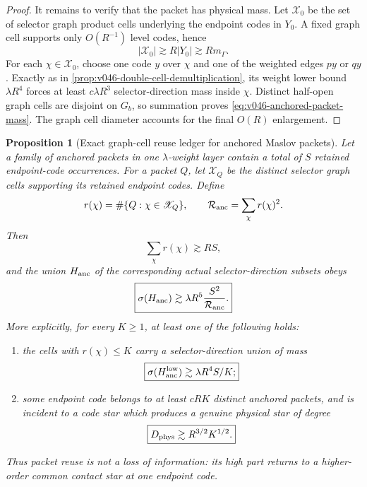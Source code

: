 \documentclass[10pt]{article}
\newtheorem{proposition}[theorem]{Proposition}
\begin{document}
\begin{proof}
It remains to verify that the packet has physical mass.  Let \(\mathscr X_0\) be the set of selector
graph product cells underlying the endpoint codes in \(Y_0\).  A fixed graph cell supports only
\(O(R^{-1})\) level codes, hence
\[
|\mathscr X_0|\gtrsim R|Y_0|\gtrsim Rm_\Gamma.
\]
For each \(\chi\in\mathscr X_0\), choose one code \(y\) over \(\chi\) and one of the weighted edges
\(py\) or \(qy\).  Exactly as in
\cref{prop:v046-double-cell-demultiplication}, its weight lower bound \(\lambda R^4\) forces at
least \(c\lambda R^3\) selector-direction mass inside \(\chi\).  Distinct half-open graph cells are
disjoint on \(G_b\), so summation proves \eqref{eq:v046-anchored-packet-mass}.  The graph cell
diameter accounts for the final \(O(R)\) enlargement.
\end{proof}

\begin{proposition}[Exact graph-cell reuse ledger for anchored Maslov packets]
\label{prop:v046-anchor-cell-reuse}
Let a family of anchored packets in one \(\lambda\)-weight layer contain a total of \(S\) retained
endpoint-code occurrences.  For a packet \(Q\), let \(\mathscr X_Q\) be the distinct selector graph
cells supporting its retained endpoint codes.  Define
\[
r(\chi)
=
\#\{Q:\chi\in\mathscr X_Q\},
\qquad
\mathcal R_{\rm anc}
=
\sum_\chi r(\chi)^2.
\]
Then
\begin{equation}
\label{eq:v046-anchor-reuse-L1}
\sum_\chi r(\chi)
\gtrsim
RS,
\end{equation}
and the union \(H_{\rm anc}\) of the corresponding actual selector-direction subsets obeys
\begin{equation}
\label{eq:v046-anchor-reuse-L2}
\boxed{
\sigma(H_{\rm anc})
\gtrsim
\lambda R^5
\frac{S^2}{\mathcal R_{\rm anc}}.
}
\end{equation}
More explicitly, for every \(K\ge1\), at least one of the following holds:
\begin{enumerate}[label=\textnormal{(\roman*)}]
\item the cells with \(r(\chi)\le K\) carry a selector-direction union of mass
\begin{equation}
\label{eq:v046-anchor-low-reuse-mass}
\boxed{
\sigma(H_{\rm anc}^{\rm low})
\gtrsim
\lambda R^4S/K;
}
\end{equation}
\item some endpoint code belongs to at least \(cRK\) distinct anchored packets, and is incident to
a code star which produces a genuine physical star of degree
\begin{equation}
\label{eq:v046-anchor-high-reuse-star}
\boxed{
D_{\rm phys}
\gtrsim
R^{3/2}K^{1/2}.
}
\end{equation}
\end{enumerate}
Thus packet reuse is not a loss of information: its high part returns to a higher-order common
contact star at one endpoint code.
\end{proposition}
\end{document}
